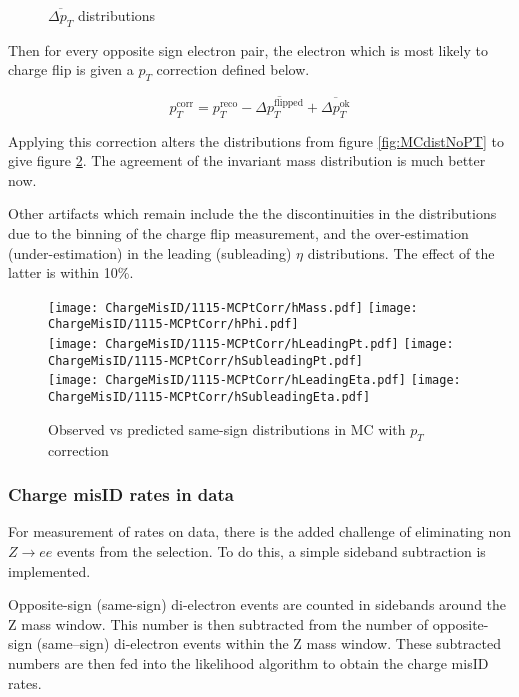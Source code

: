 \begin{figure}[h]
\ContinuedFloat
{}
\caption{$\overline{\Delta p_T}$ distributions}
\label{fig:AvgDPTdist}
\end{figure}

\FloatBarrier

Then for every opposite sign electron pair, the electron which is most likely to charge flip is given a $p_T$ correction defined below.

$$p_T^{\text{corr}} = p_T^{\text{reco}} - \overline{\Delta p_T^{\text{flipped}}} + \overline{\Delta p_T^{\text{ok}}}$$

Applying this correction alters the distributions from figure \ref{fig:MCdistNoPT} to give figure \ref{fig:MCdistWPT}. The agreement of the invariant mass distribution is much better now. 

Other artifacts which remain include the the discontinuities in the \pT distributions due to the binning of the charge flip measurement, and the over-estimation (under-estimation) in the leading (subleading) $\eta$ distributions. The effect of the latter is within 10\%.
\begin{figure}[h]
\centering
\texttt{[image: ChargeMisID/1115-MCPtCorr/hMass.pdf]}
\texttt{[image: ChargeMisID/1115-MCPtCorr/hPhi.pdf]}\\
\texttt{[image: ChargeMisID/1115-MCPtCorr/hLeadingPt.pdf]}
\texttt{[image: ChargeMisID/1115-MCPtCorr/hSubleadingPt.pdf]}\\
\texttt{[image: ChargeMisID/1115-MCPtCorr/hLeadingEta.pdf]}
\texttt{[image: ChargeMisID/1115-MCPtCorr/hSubleadingEta.pdf]}
\caption{Observed vs predicted same-sign distributions in MC with $p_T$ correction}
\label{fig:MCdistWPT}
\end{figure}
\FloatBarrier

\subsubsection*{Charge misID rates in data}
For measurement of rates on data, there is the added challenge of eliminating non $Z\rightarrow ee$ events from the selection. To do this, a simple sideband subtraction is implemented.

Opposite-sign (same-sign) di-electron events are counted in sidebands around the Z mass window. This number is then subtracted from the number of opposite-sign (same--sign) di-electron events within the Z mass window. These subtracted numbers are then fed into the likelihood algorithm to obtain the charge misID rates. 

